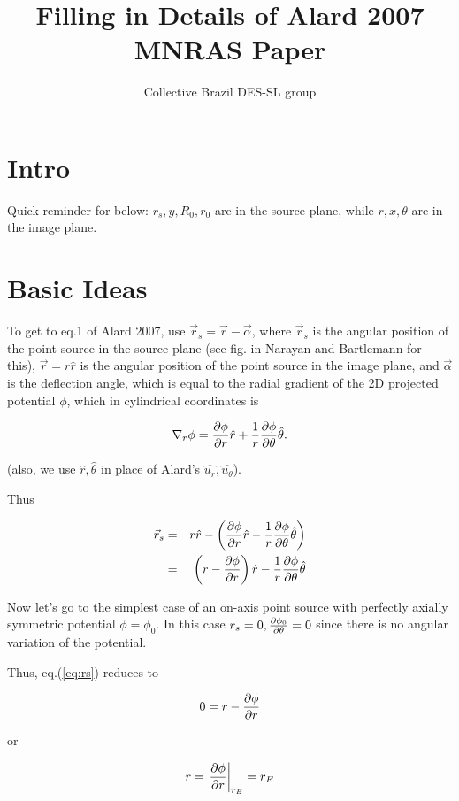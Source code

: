 \documentclass{article}
\title{Filling in Details of Alard 2007 MNRAS Paper}
\author{Collective Brazil DES-SL group}
\def\be{\begin{equation}}
\def\ee{\end{equation}}
\def\bea{\begin{eqnarray}}
\def\eea{\end{eqnarray}}
\def\prtl{\partial}
\newcommand{\rp}{\right)}
\newcommand{\lp}{\left(}
\begin{document}
\maketitle
\section{Intro}

Quick reminder for below: $r_s, y, R_0, r_0$ are in the source plane, while $r, x, \theta$ are in the image plane.

\section{Basic Ideas}

To get to eq.1 of Alard 2007, use $\vec{r}_s = \vec{r} -
\vec{\alpha}$, where $\vec{r}_s$ is the angular position of the point
source in the source plane (see fig. in Narayan and Bartlemann for
this), $\vec{r} = r \hat{r} $ is the angular position of the point
source in the image plane, and $\vec{\alpha}$ is the deflection angle,
which is equal to the radial gradient of the 2D projected potential
$\phi$, which in cylindrical coordinates is

\be
\nabla_r \phi = {\prtl  \phi \over \prtl r} \hat{r} + {1 \over r} {\prtl  \phi \over \prtl \theta} \hat{\theta}.
\ee

(also, we use $ \hat{r}, \hat{\theta}$ in place of Alard's $\hat{u_r},
\hat{u_\theta}$).

Thus 

\bea
\vec{r}_s & = & r \hat{r} - \lp {\prtl  \phi \over \prtl r} \hat{r} - {1 \over r} {\prtl  \phi \over \prtl \theta} \hat{\theta} \rp \\
\label{eq:rs}
& = & \lp r -  {\prtl  \phi \over \prtl r} \rp \hat{r} -  {1 \over r} {\prtl  \phi \over \prtl \theta} \hat{\theta} 
\eea

Now let's go to the simplest case of an on-axis point source with
perfectly axially symmetric potential $\phi = \phi_0$.  In this case
$r_s = 0, {\prtl \phi_0 \over \prtl \theta} = 0$ since there is no
angular variation of the potential.

Thus, eq.(\ref{eq:rs}) reduces to

\be
0 =  r -  {\prtl  \phi \over \prtl r} 
\ee

or

\be
\label{eq:einsteinradius}
  r =  \left. {\prtl  \phi \over \prtl r} \right|_{r_E} = r_E
\ee
\end{document}
